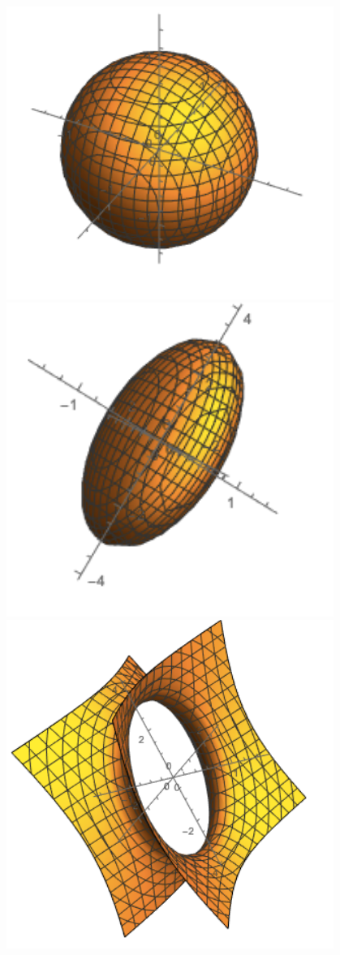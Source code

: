\documentclass{tufte-book} %
\begin{document}
 \begin{marginfigure}
  \includegraphics[width=0.8\textwidth]{figures/qsurf1.png}
  \includegraphics[width=0.8\textwidth]{figures/qsurf2.png}
  \includegraphics[width=0.8\textwidth]{figures/qsurf3.png}

\end{marginfigure}
\end{document}
